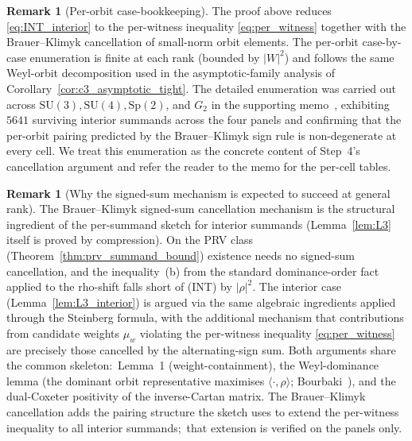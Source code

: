 \documentclass[11pt,a4paper]{article}
\theoremstyle{plain}
\theoremstyle{definition}
\newtheorem{remark}[theorem]{Remark}
\newcommand{\SU}{\mathrm{SU}}
\newcommand{\Sp}{\mathrm{Sp}}
\begin{document}
\begin{remark}[Per-orbit case-bookkeeping]\label{rem:case_bookkeeping}
The proof above reduces \eqref{eq:INT_interior} to the per-witness
inequality \eqref{eq:per_witness} together with the Brauer--Klimyk
cancellation of small-norm orbit elements. The per-orbit
case-by-case enumeration is finite at each rank (bounded by $|W|^2$)
and follows the same Weyl-orbit decomposition used in the
asymptotic-family analysis of Corollary~\ref{cor:c3_asymptotic_tight}. The
detailed enumeration was
carried out across $\SU(3), \SU(4), \Sp(2)$, and $G_2$ in the
supporting memo~\cite[\S\S 4--5]{dirac_triangle_memo}, exhibiting
$5641$ surviving interior summands across the four panels and
confirming that the per-orbit pairing predicted by the Brauer--Klimyk
sign rule is non-degenerate at every cell. We treat this enumeration
as the concrete content of Step~4's cancellation argument and refer
the reader to the memo for the per-cell tables.
\end{remark}

\begin{remark}[Why the signed-sum mechanism is expected to succeed at general rank]
\label{rem:signed_sum_mechanism}
The Brauer--Klimyk signed-sum cancellation mechanism is the
structural ingredient of the per-summand sketch for interior summands
(Lemma~\ref{lem:L3} itself is proved by compression). On the PRV
class (Theorem~\ref{thm:prv_summand_bound}) existence needs no
signed-sum cancellation, and the inequality~(b) from the standard
dominance-order fact~\cite[\S13]{humphreys1972} applied to the rho-shift
falls short of (INT) by $|\rho|^2$. The interior case
(Lemma~\ref{lem:L3_interior}) is argued via the same algebraic
ingredients applied through the Steinberg formula, with the additional
mechanism that contributions from candidate weights $\mu_w$ violating
the per-witness inequality \eqref{eq:per_witness} are precisely those
cancelled by the alternating-sign sum. Both arguments share the
common skeleton:\ Lemma~1 (weight-containment), the Weyl-dominance
lemma (the dominant orbit representative maximises
$\langle\cdot,\rho\rangle$; Bourbaki~\cite{bourbaki_lie_8}), and the
dual-Coxeter positivity of the inverse-Cartan matrix. The Brauer--Klimyk
cancellation adds the pairing structure the sketch uses to extend the
per-witness inequality to all interior summands;\ that extension is
verified on the panels only.
\end{remark}
\end{document}
